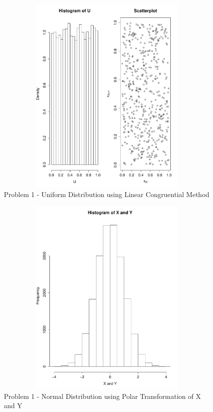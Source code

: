 \documentclass[paper=a4, fontsize=11pt]{scrartcl} %
\numberwithin{equation}{section} %
\numberwithin{figure}{section} %
\numberwithin{table}{section} %
\begin{document}
\begin{figure}[h!]
	\centering
	\includegraphics[width=15cm, height=10cm]{1a.pdf}
	\caption{Problem 1 - Uniform Distribution using Linear Congruential Method} 
\end{figure}

\begin{figure}[h!]
	\centering
	\includegraphics[width=15cm, height=10cm]{1ba.pdf}
	\caption{Problem 1 - Normal Distribution using Polar Transformation of X and Y} 
\end{figure}
\end{document}
